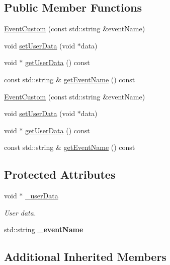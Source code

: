 \subsection*{Public Member Functions}
\begin{DoxyCompactItemize}
\item 
\hyperlink{classEventCustom_ac8691ca37cf1cd481c3308a3a8df9cdf}{Event\+Custom} (const std\+::string \&event\+Name)
\item 
void \hyperlink{classEventCustom_a63403ffc75d834cc39e405e7aa47aa3a}{set\+User\+Data} (void $\ast$data)
\item 
void $\ast$ \hyperlink{classEventCustom_a529d67c97ccfc46cff7a18878fd396f9}{get\+User\+Data} () const
\item 
const std\+::string \& \hyperlink{classEventCustom_ad958403590c798a14c6cb37f33181729}{get\+Event\+Name} () const
\item 
\hyperlink{classEventCustom_ab241d76c49f15b3e90a877371cc5c016}{Event\+Custom} (const std\+::string \&event\+Name)
\item 
void \hyperlink{classEventCustom_a63403ffc75d834cc39e405e7aa47aa3a}{set\+User\+Data} (void $\ast$data)
\item 
void $\ast$ \hyperlink{classEventCustom_a529d67c97ccfc46cff7a18878fd396f9}{get\+User\+Data} () const
\item 
const std\+::string \& \hyperlink{classEventCustom_ad958403590c798a14c6cb37f33181729}{get\+Event\+Name} () const
\end{DoxyCompactItemize}
\subsection*{Protected Attributes}
\begin{DoxyCompactItemize}
\item 
\mbox{\label{classEventCustom_a2bb67e5b8b81f4d9f0447f5a8719f41c}} 
void $\ast$ \hyperlink{classEventCustom_a2bb67e5b8b81f4d9f0447f5a8719f41c}{\+\_\+user\+Data}
\begin{DoxyCompactList}\small\item\em User data. \end{DoxyCompactList}\item 
\mbox{\label{classEventCustom_ae901be35174b95fbf6e834415ad3a1d3}} 
std\+::string {\bfseries \+\_\+event\+Name}
\end{DoxyCompactItemize}
\subsection*{Additional Inherited Members}


